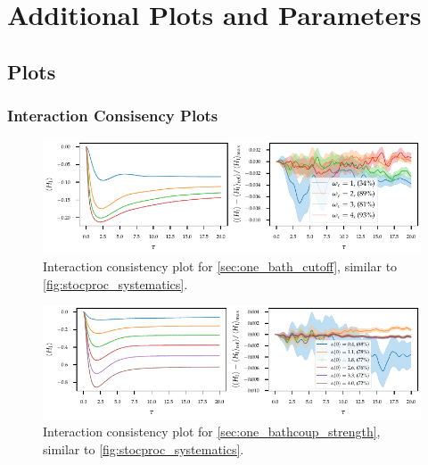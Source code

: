\chapter{Additional Plots and Parameters\label{chap:plus_plots_params}}

\section{Plots}
\label{sec:plus_plots}

\subsection{Interaction Consisency Plots}
\label{sec:intercons}
\begin{figure}[H]
  \centering
  \includegraphics{figs/one_bath_syst/omega_interaction_consistency}
  \caption{\label{fig:omega_interaction_consistency}Interaction
    consistency plot for \cref{sec:one_bath_cutoff}, similar to
    \cref{fig:stocproc_systematics}.}
\end{figure}
\begin{figure}[H]
  \centering
  \includegraphics{figs/one_bath_syst/delta_interaction_consistency}
  \caption{\label{fig:delta_interaction_consistency}Interaction
    consistency plot for \cref{sec:one_bathcoup_strength}, similar to
    \cref{fig:stocproc_systematics}.}
\end{figure}

